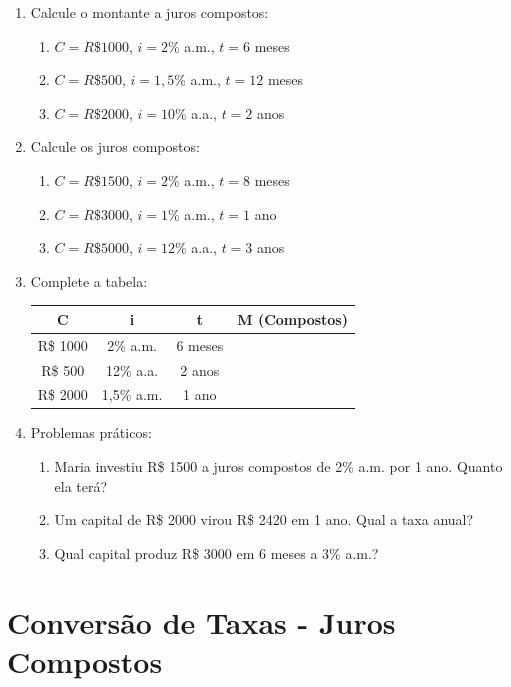 \documentclass[11pt]{article}
\begin{document}
\begin{multicols}{2}
\begin{enumerate}[leftmargin=*]

\item Calcule o montante a juros compostos:
\begin{enumerate}[label=\alph*)]
\item $C = R\$ 1000$, $i = 2\%$ a.m., $t = 6$ meses
\item $C = R\$ 500$, $i = 1,5\%$ a.m., $t = 12$ meses
\item $C = R\$ 2000$, $i = 10\%$ a.a., $t = 2$ anos
\end{enumerate}

\item Calcule os juros compostos:
\begin{enumerate}[label=\alph*)]
\item $C = R\$ 1500$, $i = 2\%$ a.m., $t = 8$ meses
\item $C = R\$ 3000$, $i = 1\%$ a.m., $t = 1$ ano
\item $C = R\$ 5000$, $i = 12\%$ a.a., $t = 3$ anos
\end{enumerate}

\item Complete a tabela:
\begin{center}
\begin{tabular}{|c|c|c|c|}
\hline
\textbf{C} & \textbf{i} & \textbf{t} & \textbf{M (Compostos)} \\
\hline
R\$ 1000 & 2\% a.m. & 6 meses & \\
\hline
R\$ 500 & 12\% a.a. & 2 anos & \\
\hline
R\$ 2000 & 1,5\% a.m. & 1 ano & \\
\hline
\end{tabular}
\end{center}

\item Problemas práticos:
\begin{enumerate}[label=\alph*)]
\item Maria investiu R\$ 1500 a juros compostos de 2\% a.m. por 1 ano. Quanto ela terá?
\item Um capital de R\$ 2000 virou R\$ 2420 em 1 ano. Qual a taxa anual?
\item Qual capital produz R\$ 3000 em 6 meses a 3\% a.m.?
\end{enumerate}

\end{enumerate}

\section*{Conversão de Taxas - Juros Compostos}


\end{multicols}
\end{document}
